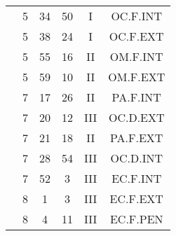 \documentclass[12pt, a4paper]{article}
\begin{document}
\begin{multicols}{3}
{\begin{tabular}{c c c c c c}
	 	 	 	 & 5 & 34 & 50 & I & OC.F.INT\\%
	 	 	 	 & 5 & 38 & 24 & I & OC.F.EXT\\%
	 	 	 	 & 5 & 55 & 16 & II & OM.F.INT\\%
	 	 	 	 & 5 & 59 & 10 & II & OM.F.EXT\\%
	 	 	 	 & 7 & 17 & 26 & II & PA.F.INT\\%
	 	 	 	 & 7 & 20 & 12 & III & OC.D.EXT\\%
	 	 	 	 & 7 & 21 & 18 & II & PA.F.EXT\\%
	 	 	 	 & 7 & 28 & 54 & III & OC.D.INT\\%
	 	 	 	 & 7 & 52 & 3 & III & EC.F.INT\\%
	 	 	 	 & 8 & 1 & 3 & III & EC.F.EXT\\%
	 	 	 	 & 8 & 4 & 11 & III & EC.F.PEN\\%
	 	 \end{tabular}
 	}
\end{multicols}
\end{document}

